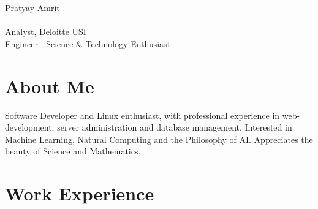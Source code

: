 \documentclass[10pt]{article} %
\begin{document}
\begin{paracol}{2} %


\parbox[top][0.12\textheight][c]{\linewidth}{ %
	\vspace{-0.04\textheight} %
	{\cvtextfont\Huge Pratyay Amrit}\\\medskip %
    \\\medskip
	{\LARGE\color{headings} Analyst, Deloitte USI}\\\medskip
    {\Large\color{headings} Engineer | Science \& Technology Enthusiast}
}


\section{About Me}

Software Developer and Linux enthusiast, with professional experience in web-development, server administration and database management. Interested in Machine Learning, Natural Computing and the Philosophy of AI. Appreciates the beauty of Science and Mathematics.

\medskip %


\section{Work Experience}




\end{paracol}
\end{document}
